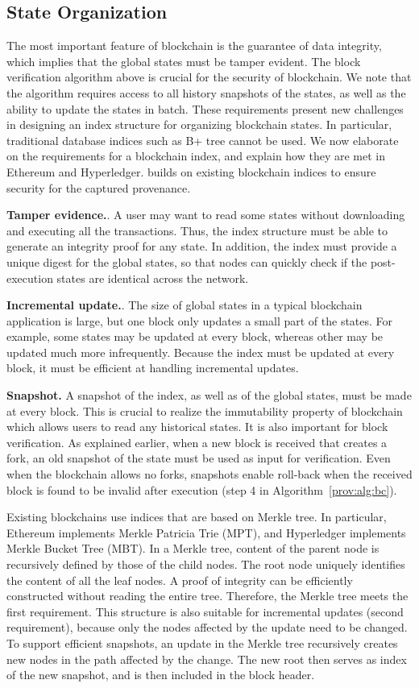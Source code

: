 \subsection{State Organization}
The most important feature of blockchain is the guarantee of data integrity, which implies that the global
states must be tamper evident. The block verification algorithm above is crucial for the security of
blockchain. We note that the algorithm requires access to all history snapshots of the states, as well as the
ability to update the states in batch. These requirements present new challenges in
designing an index structure for organizing blockchain states. In particular, traditional database indices
such as B+ tree cannot be used. We now elaborate on the requirements for a blockchain index, and
explain how they are met in Ethereum and Hyperledger. {\fs} builds on existing blockchain indices to
ensure security for the captured provenance.
  
\textbf{Tamper evidence.}. A user may want to read some states without downloading and
executing all the transactions. Thus, the index structure must be able to generate an integrity proof for any
state. In addition, the index must provide a unique digest for the global states, so that nodes can quickly
check if the post-execution states are identical across the network. 

\textbf{Incremental update.}. The size of global states in a typical blockchain
application is large, but one block only updates a small part of the states. For example, some states may be
updated at every block, whereas other may be updated much more infrequently. Because the index must be
updated at every block, it must be efficient at handling incremental updates. 
  
\textbf{Snapshot.} A snapshot of the index, as well as of the global states, must be
made at every block. This is crucial to realize the immutability property of blockchain which allows users to
read any historical states. It is also important for block verification. As explained earlier, when a new
block is received that creates a fork, an old snapshot of the state must be used as input for verification.
Even when the blockchain allows no forks, snapshots enable roll-back when the received block is found to be
invalid after execution (step 4 in Algorithm~\ref{prov:alg:bc}). 

Existing blockchains use indices that are based on Merkle tree. In particular, Ethereum implements Merkle
Patricia Trie (MPT), and Hyperledger implements Merkle Bucket Tree (MBT). In a Merkle tree,
content of the parent node is recursively defined by those of the child nodes. The root node uniquely
identifies the content of all the leaf nodes. A proof of integrity can be efficiently constructed without
reading the entire tree. Therefore, the Merkle tree meets the first requirement. This structure is also
suitable for incremental updates (second requirement), because only the nodes affected by the update need to
be changed. To support efficient snapshots, an update in the Merkle tree recursively creates new nodes in the
path affected by the change. The new root then serves as index of the new snapshot, and is then
included in the block header.

